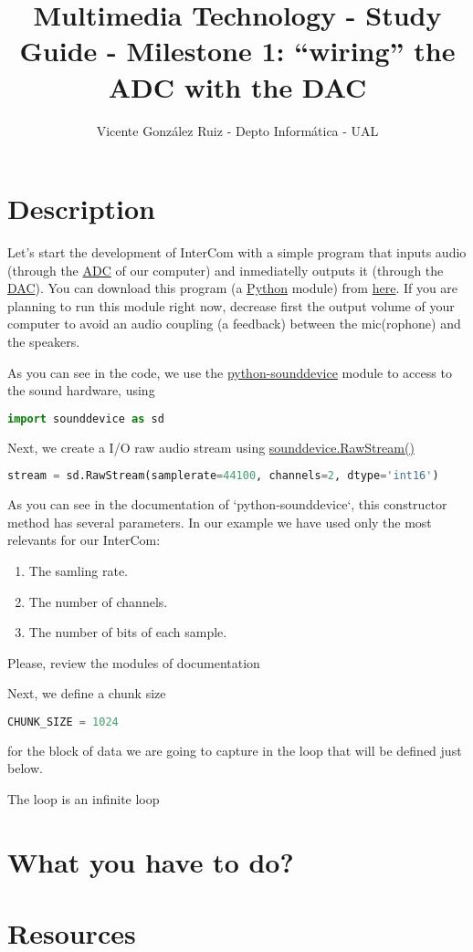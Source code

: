 \title{Multimedia Technology - Study Guide - Milestone 1: ``wiring'' the ADC with the DAC}
\author{Vicente González Ruiz - Depto Informática - UAL}

\section{Description}
Let's start the development of InterCom with a simple program that
inputs audio (through
the \href{https://en.wikipedia.org/wiki/Analog-to-digital_converter}{ADC}
of our computer) and inmediatelly outputs it (through
the \href{https://en.wikipedia.org/wiki/Digital-to-analog_converter}{DAC}). You
can download this program (a \href{https://www.python.org}{Python}
module)
from \href{https://github.com/Tecnologias-multimedia/intercom/blob/master/test/sounddevice/wire3.py}{here}. If
you are planning to run this module right now, decrease first the
output volume of your computer to avoid an audio coupling (a feedback)
between the mic(rophone) and the speakers.

As you can see in the code, we use
the \href{https://python-sounddevice.readthedocs.io/en/latest/}{python-sounddevice}
module to access to the sound hardware, using

\begin{lstlisting}[language=Python]
import sounddevice as sd
\end{lstlisting}

Next, we create a I/O raw audio stream
using \href{https://python-sounddevice.readthedocs.io/en/latest/api/raw-streams.html#sounddevice.RawStream}{sounddevice.RawStream()}
\begin{lstlisting}[language=Python]
stream = sd.RawStream(samplerate=44100, channels=2, dtype='int16')
\end{lstlisting}
As you can see in the documentation of `python-sounddevice`, this
constructor method has several parameters. In our example we have used
only the most relevants for our InterCom:
\begin{enumerate}
\item The samling rate.
\item The number of channels.
\item The number of bits of each sample.
\end{enumerate}
Please, review the modules of documentation 

Next, we define a chunk size
\begin{lstlisting}[language=Python]
CHUNK_SIZE = 1024
\end{lstlisting}
for the block of data we are going to capture in the loop that will
be defined just below.

The loop is an infinite loop

\section{What you have to do?}

\section{Resources}

